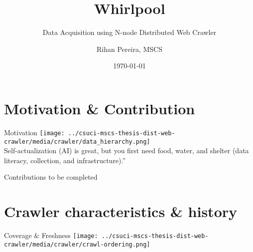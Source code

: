 \documentclass[9pt]{beamer}
\title{Whirlpool}
\subtitle{Data Acquisition using N-node Distributed Web Crawler}
\author{Rihan Pereira, MSCS}
\institute[California State University Channel Islands]
{
  \textit{Advisor:} Dr. Michael Soltys\\
  Department of Computer Science \\
  MSCS Graduate 2018-2019
}
\date{\today}
\begin{document}
\begin{frame}[plain]
  \titlepage
\end{frame}

\begin{frame}[plain]
  \tableofcontents[hideallsubsections]
\end{frame}

\section[Motiv. \& Contrib]{Motivation \& Contribution}
\begin{frame}[plain]
\end{frame}


\begin{frame}{Motivation}
  \centering
  \texttt{[image: ../csuci-mscs-thesis-dist-web-crawler/media/crawler/data\_hierarchy.png]}
  \pause
  \\
  Self-actualization (AI) is great, but you first need food, water, and shelter (data literacy, collection, and infrastructure).”
\end{frame}


\begin{frame}{Contributions}
  to be completed
\end{frame}


\section[Crawler history]{Crawler characteristics \& history}
\begin{frame}[plain]
\end{frame}


\begin{frame}{Coverage \& Freshness}
  \centering
  \texttt{[image: ../csuci-mscs-thesis-dist-web-crawler/media/crawler/crawl-ordering.png]}
\end{frame}
\end{document}
